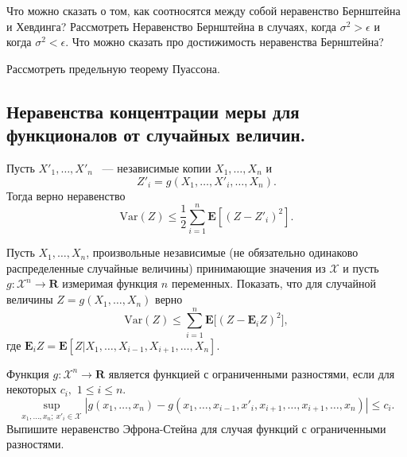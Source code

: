 \begin{problem}
Что можно сказать о том, как соотносятся между собой неравенство Бернштейна и Хевдинга? Рассмотреть Неравенство Бернштейна в случаях, когда $\sigma^2>\epsilon$ и когда $\sigma^2<\epsilon$. Что можно сказать про достижимость неравенства Бернштейна? 
\begin{remark}
Рассмотреть предельную теорему Пуассона.
\end{remark}
\end{problem}

\subsection{Неравенства концентрации меры для функционалов от случайных величин.}
\medskip

\begin{problem}
Пусть $X'_1,\dots,X'_n$ ~--- независимые копии $X_1,\dots,X_n$ и 
\begin{equation*}
Z'_i = g(X_1,\dots, X'_i,\dots,X_n).
\end{equation*}
Тогда верно неравенство 
\begin{equation*}
\text{Var}(Z)\leq \frac{1}{2}\sum_{i=1}^{n}\mathbf{E}[(Z-Z'_i)^2].
\end{equation*}
\end{problem}
\begin{remark}
 
Пусть $X_1,\dots, X_n$, произвольные независимые (не обязательно одинаково распределенные случайные величины) принимающие значения из $\mathcal{X}$ и пусть  $g: \mathcal{X}^n\to \mathbf{R}$ измеримая функция $n$ переменных. Показать, что для случайной величины $Z = g(X_1,\dots,X_n)$ верно 
\begin{equation*}
\text{Var}(Z) \leq \sum_{i=1}^n \mathbf{E}\big[ (Z-\mathbf{E}_iZ)^2\bigl],
\end{equation*}
где $\mathbf{E}_iZ = \mathbf{E}[Z|X_1,\dots,X_{i-1},X_{i+1},\dots,X_n]$.
\end{remark}
\begin{problem}
Функция $g: \mathcal{X}^n\to \mathbf{R}$ является функцией с ограниченными разностями, если для некоторых $c_i,$  $1\leq i\leq n$.
\begin{equation*}
\sup_{x_1,\dots,x_n;\, x'_i\in\mathcal{X}} |g(x_1,\dots,x_n)-g(x_1,\dots,x_{i-1},x'_i,x_{i+1},\dots,x_{i+1},\dots,x_n)|\leq c_i. 
\end{equation*}
Выпишите неравенство Эфрона-Стейна для случая функций с ограниченными разностями.
\end{problem}
\medskip

